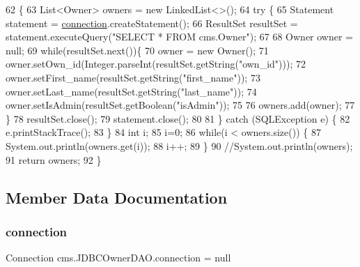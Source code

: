 \begin{DoxyCode}
62                                 \{
63         List<Owner> owners = \textcolor{keyword}{new} LinkedList<>();
64          \textcolor{keywordflow}{try} \{
65                 Statement statement = \mbox{\hyperlink{classcms_1_1_j_d_b_c_owner_d_a_o_a76b8cb63ccf288ce8ca2f767a045372c}{connection}}.createStatement();
66                 ResultSet resultSet = statement.executeQuery(\textcolor{stringliteral}{"SELECT * FROM cms.Owner"});
67                  
68                 Owner owner = null;
69                 \textcolor{keywordflow}{while}(resultSet.next())\{
70                     owner = \textcolor{keyword}{new} Owner();
71                     owner.setOwn\_id(Integer.parseInt(resultSet.getString(\textcolor{stringliteral}{"own\_id"})));
72                     owner.setFirst\_name(resultSet.getString(\textcolor{stringliteral}{"first\_name"}));
73                     owner.setLast\_name(resultSet.getString(\textcolor{stringliteral}{"last\_name"}));
74                     owner.setIsAdmin(resultSet.getBoolean(\textcolor{stringliteral}{"isAdmin"}));
75                      
76                     owners.add(owner);
77                 \}
78                 resultSet.close();
79                 statement.close();
80                  
81             \} \textcolor{keywordflow}{catch} (SQLException e) \{
82                 e.printStackTrace();
83             \}
84             \textcolor{keywordtype}{int} i;
85             i=0;
86             \textcolor{keywordflow}{while}(i < owners.size()) \{
87                     System.out.println(owners.get(i));
88                     i++;
89              \}
90             \textcolor{comment}{//System.out.println(owners);}
91             \textcolor{keywordflow}{return} owners;
92     \}
\end{DoxyCode}


\subsection{Member Data Documentation}
\mbox{\label{classcms_1_1_j_d_b_c_owner_d_a_o_a76b8cb63ccf288ce8ca2f767a045372c}} 
\subsubsection{\texorpdfstring{connection}{connection}}
{\footnotesize\ttfamily Connection cms.\+J\+D\+B\+C\+Owner\+D\+A\+O.\+connection = null\hspace{0.3cm}{\ttfamily [package]}}

